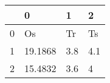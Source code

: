 \begin{tabular}{llll}
\toprule
{} &        0 &    1 &    2 \\
\midrule
0 &       Os &   Tr &   Ts \\
1 &  19.1868 &  3.8 &  4.1 \\
2 &  15.4832 &  3.6 &    4 \\
\bottomrule
\end{tabular}
